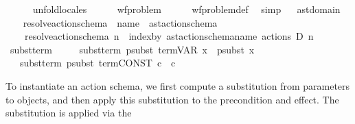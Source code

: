 \begin{isabellebody}
%
\isadelimproof
\ \ \ \ %
\endisadelimproof
%
\isatagproof
{}\isamarkupfalse%
\ unfold{\isacharunderscore}{\kern0pt}locales\isanewline
\ \ \ \ \isamarkupfalse%
\ wf{\isacharunderscore}{\kern0pt}problem\isanewline
\ \ \ \ \isamarkupfalse%
\ wf{\isacharunderscore}{\kern0pt}problem{\isacharunderscore}{\kern0pt}def\ \isamarkupfalse%
\ simp%
\endisatagproof
{\isafoldproof}%
%
\isadelimproof
\isanewline
%
\endisadelimproof
\isanewline
{}\isamarkupfalse%
\ %
%
\isadelimdocument
%
\endisadelimdocument
%
\isatagdocument
%
\isamarkuptrue%
%
\endisatagdocument
{\isafolddocument}%
%
\isadelimdocument
%
\endisadelimdocument
{}\isamarkupfalse%
\ ast{\isacharunderscore}{\kern0pt}domain\ \isanewline
\isanewline
\ \ \isamarkupfalse%
\ resolve{\isacharunderscore}{\kern0pt}action{\isacharunderscore}{\kern0pt}schema\ {\isacharcolon}{\kern0pt}{\isacharcolon}{\kern0pt}\ {\isachardoublequoteopen}name\ {\isasymrightharpoonup}\ ast{\isacharunderscore}{\kern0pt}action{\isacharunderscore}{\kern0pt}schema{\isachardoublequoteclose}\ \isanewline
\ \ \ \ {\isachardoublequoteopen}resolve{\isacharunderscore}{\kern0pt}action{\isacharunderscore}{\kern0pt}schema\ n\ {\isacharequal}{\kern0pt}\ index{\isacharunderscore}{\kern0pt}by\ ast{\isacharunderscore}{\kern0pt}action{\isacharunderscore}{\kern0pt}schema{\isachardot}{\kern0pt}name\ {\isacharparenleft}{\kern0pt}actions\ D{\isacharparenright}{\kern0pt}\ n{\isachardoublequoteclose}\isanewline
\isanewline
\ \ \isamarkupfalse%
\ subst{\isacharunderscore}{\kern0pt}term\ \isanewline
\ \ \ \ {\isachardoublequoteopen}subst{\isacharunderscore}{\kern0pt}term\ psubst\ {\isacharparenleft}{\kern0pt}term{\isachardot}{\kern0pt}VAR\ x{\isacharparenright}{\kern0pt}\ {\isacharequal}{\kern0pt}\ psubst\ x{\isachardoublequoteclose}\isanewline
\ \ {\isacharbar}{\kern0pt}\ {\isachardoublequoteopen}subst{\isacharunderscore}{\kern0pt}term\ psubst\ {\isacharparenleft}{\kern0pt}term{\isachardot}{\kern0pt}CONST\ c{\isacharparenright}{\kern0pt}\ {\isacharequal}{\kern0pt}\ c{\isachardoublequoteclose}%
\begin{isamarkuptext}%
To instantiate an action schema, we first compute a substitution from
    parameters to objects, and then apply this substitution to the
    precondition and effect. The substitution is applied via the 

\end{isamarkuptext}
\end{isabellebody}
